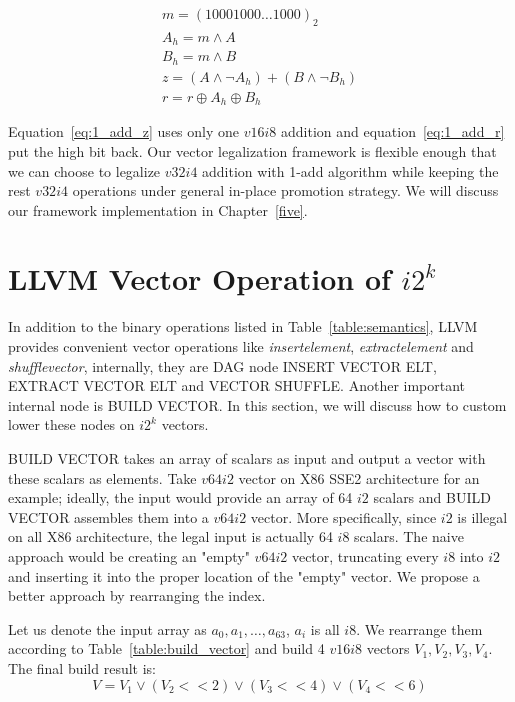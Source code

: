 \begin{gather}
  m = (10001000 \ldots 1000)_2 \\
  A_h = m \land A \\
  B_h = m \land B \\
  z = (A \land \lnot A_h) + (B \land \lnot B_h) \label{eq:1_add_z}\\
  r = r \oplus A_h \oplus B_h \label{eq:1_add_r}
\end{gather}

Equation~\eqref{eq:1_add_z} uses only one $v16i8$ addition and equation~\eqref{eq:1_add_r} put the high bit back. Our vector legalization framework is flexible enough that we can choose to legalize $v32i4$ addition with 1-add algorithm while keeping the rest $v32i4$ operations under general in-place promotion strategy. We will discuss our framework implementation in Chapter~\ref{five}.

\section{LLVM Vector Operation of $i2^k$}
In addition to the binary operations listed in Table~\ref{table:semantics}, LLVM provides convenient vector operations like \textit{insertelement}, \textit{extractelement} and \textit{shufflevector}, internally, they are DAG node INSERT VECTOR ELT, EXTRACT VECTOR ELT and VECTOR SHUFFLE\@. Another important internal node is BUILD VECTOR\@. In this section, we will discuss how to custom lower these nodes on $i2^k$ vectors.

BUILD VECTOR takes an array of scalars as input and output a vector with these scalars as elements. Take $v64i2$ vector on X86 SSE2 architecture for an example; ideally, the input would provide an array of 64 $i2$ scalars and BUILD VECTOR assembles them into a $v64i2$ vector. More specifically, since $i2$ is illegal on all X86 architecture, the legal input is actually 64 $i8$ scalars. The naive approach would be creating an "empty" $v64i2$ vector, truncating every $i8$ into $i2$ and inserting it into the proper location of the "empty" vector. We propose a better approach by rearranging the index.

Let us denote the input array as $a_0, a_1, \ldots, a_{63}$, $a_i$ is all $i8$. We rearrange them according to Table~\ref{table:build_vector} and build 4 $v16i8$ vectors $V_1, V_2, V_3, V_4$. The final build result is:
\begin{equation}
  V = V_1 \lor (V_2 << 2) \lor (V_3 << 4) \lor (V_4 << 6)
\end{equation}

